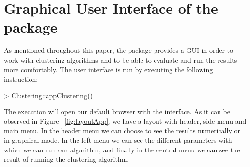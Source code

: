 \section{Graphical User Interface of the  package}

As mentioned throughout this paper, the  package provides a GUI in order to work with clustering algorithms and to be able to evaluate and run the results more comfortably. The user interface is run by executing the following instruction:

\begin{Schunk}
\begin{Sinput}
> Clustering::appClustering()
\end{Sinput}
\end{Schunk}

The execution will open our default browser with the interface. As it can be observed in Figure ~\ref{fig:layoutApp}, we have a layout with header, side menu and main menu. In the header menu we can choose to see the results numerically or in graphical mode. In the left menu we can see the different parameters with which we can run our algorithm, and finally in the central menu we can see the result of running the clustering algorithm.

